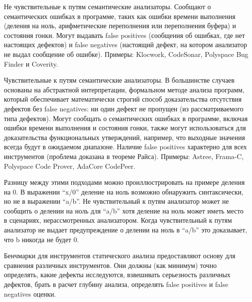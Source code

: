 Не чувствительные к путям семантические анализаторы. Сообщают о семантических ошибках 
в программе, таких как ошибки времени выполнения (деления на ноль, арифметические переполнения
или переполнения буфера) и состояния гонки. Могут выдавать false positives
(сообщения об ошибках, где нет настоящих дефектов) и false negatives (настоящий дефект, на котором
анализатор не выдал сообщение об ошибке). Примеры: Klocwork\cite{Klocwork}, 
CodeSonar\cite{Codesonar}, Polyspace Bug Finder\cite{Polyspace}
и Coverity\cite{Coverity}.

Чувствительные к путям семантические анализаторы. В большинстве случаев основаны на абстрактной 
интерпретации, формальном методе анализа программ, который обеспечивает математически
строгий способ доказательства отсутствия дефектов без false negatives: ни один дефект 
не пропущен (из рассматриваемого типа дефектов). Могут сообщать о 
семантических ошибках в программе, включая ошибки времени выполнения и состояния гонки,
также могут использоваться для доказательства функциональных утверждений, например, что 
выходные значения всегда будут в ожидаемом диапазоне. Наличие false positives характерно для всех инструментов
(проблема доказана в теореме Райса\cite{RiceT}).
Примеры: Astree\cite{Astree},
Frama-C\cite{Frama}, Polyspace Code Prover\cite{Polyspace2prover}, 
AdaCore CodePeer\cite{Codepeer}.

Разницу между этими подходами можно проиллюстрировать на примере деления на 0. В выражении 
``x/0'' деление на ноль возможно обнаружить синтаксически, но не в выражении ``a/b''. Не чувствительный к путям анализатор 
может не сообщить о делении на ноль для ``a/b'' хотя деление на ноль может иметь место в сценариях,
нерассмотренных анализатором. Когда чувствительный к путям анализатор не выдает предупреждение о делении на ноль
в ``a/b'' это доказывает, что b никогда не будет 0. 

Бенчмарки для инструментов статического анализа предоставляют основу для сравнения
различных инструментов. Они должны (как минимум) точно определять, какие дефекты исследуются,
взвешивать серьезность различных дефектов, %
брать в расчет глубину анализа, определять
false positives и false negatives оценки.



